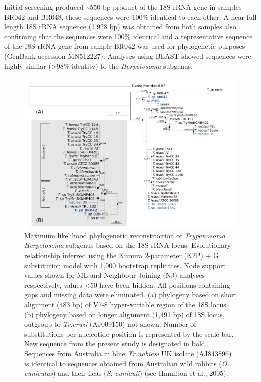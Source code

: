 \documentclass[a4paper, nobind]{templates/ociamthesis}
\begin{document}
Initial screening produced \textasciitilde550 bp product of the 18S rRNA gene in samples BR042 and BR048, these sequences were 100\% identical to each other. A near full length 18S rRNA sequence (1,928 bp) was obtained from both samples also confirming that the sequences were 100\% identical and a representative sequence of the 18S rRNA gene from sample BR042 was used for phylogenetic purposes (GenBank accession MN512227). Analyses using BLAST showed sequences were highly similar (\textgreater98\% identity) to the \emph{Herpetosoma} subgenus.

\begin{figure}
\includegraphics[width=0.95\linewidth]{figures/ms-figs/Ch5-Fig1} \caption[Phylogeny of \textit{Trypanosoma Herpetosoma} subgenus based on the 18S rRNA locus.]{Maximum likelihood phylogenetic reconstruction of \textit{Trypanosoma Herpetosoma} subgenus based on the 18S rRNA locus. Evolutionary relationship inferred using the Kimura 2-parameter (K2P) + G substitution model with 1,000 bootstrap replicates. Node support values shown for ML and Neighbour-Joining (NJ) analyses respectively, values <50 have been hidden. All positions containing gaps and missing data were eliminated. (a) phylogeny based on short alignment (483 bp) of V7-8 hyper-variable region of the 18S locus (b) phylogeny based on longer alignment (1,491 bp) of 18S locus, outgroup to \textit{Tr.cruzi} (AJ009150) not shown. Number of substitutions per nucleotide position is represented by the scale bar. New sequence from the present study is designated in bold. Sequences from Australia in blue \textit{Tr.nabiasi} UK isolate (AJ843896) is identical to sequences obtained from Australian wild rabbits (\textit{O. cuniculus}) and their fleas (\textit{S. cuniculi}) (see Hamilton et al., 2005).}\label{fig:F51}
\end{figure}
\end{document}
